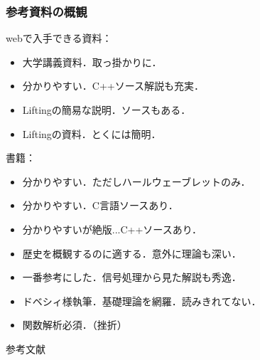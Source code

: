 \documentclass[dvipdfmx,graphicx,14pt]{beamer}
\begin{document}
\begin{frame}[c]
  \frametitle{参考資料の概観}
  \footnotesize
  webで入手できる資料：
  \begin{itemize}
  \item \cite{ito_wavelet, haneishi_wavelet1, haneishi_wavelet2} 大学講義資料．取っ掛かりに．
  \item \cite{fussy_wavelet1, fussy_wavelet2} 分かりやすい．C++ソース解説も充実．
  \item \cite{ian_lifting} Liftingの簡易な説明．ソースもある．
  \item \cite{fujinoki2014, uytterhoeven1997, fujinoki2018} Liftingの資料．とくに\cite{uytterhoeven1997}は簡明．
  \end{itemize}
  書籍：
  \begin{itemize}
  \item \cite{kanatani2003} 分かりやすい．ただしハールウェーブレットのみ．
  \item \cite{nakano_wavelet} 分かりやすい．C言語ソースあり．
  \item \cite{toda2005} 分かりやすいが絶版...C++ソースあり．
  \item \cite{hubbard2003} 歴史を概観するのに適する．意外に理論も深い．
  \item \cite{maeda2001} 一番参考にした．信号処理から見た解説も秀逸．
  \item \cite{daubechies2012} ドベシィ様執筆．基礎理論を網羅．読みきれてない．
  \item \cite{chui1993} 関数解析必須．（挫折）
  \end{itemize}
\end{frame}

\begin{frame}[allowframebreaks]{参考文献}
\scriptsize
\beamertemplatetextbibitems
\printbibliography[heading=none]
\end{frame}
\end{document}

